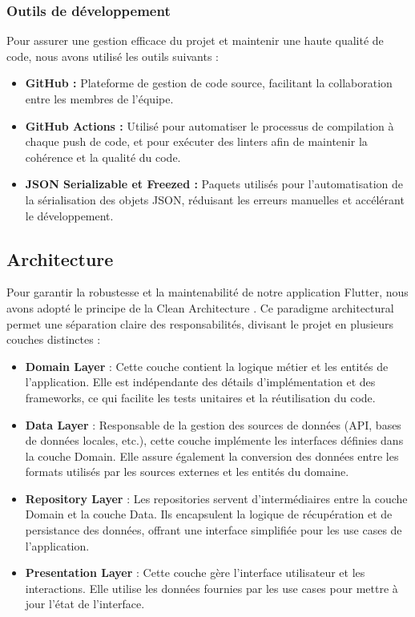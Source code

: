 \subsubsection{Outils de développement}

Pour assurer une gestion efficace du projet et maintenir une haute qualité de code, nous avons utilisé les outils suivants :

\begin{itemize}[noitemsep]
    \item \textbf{GitHub :} Plateforme de gestion de code source, facilitant la collaboration entre les membres de l'équipe.
    \item \textbf{GitHub Actions :} Utilisé pour automatiser le processus de compilation à chaque push de code, et pour exécuter des linters afin de maintenir la cohérence et la qualité du code.
    \item \textbf{JSON Serializable et Freezed :} Paquets utilisés pour l'automatisation de la sérialisation des objets JSON, réduisant les erreurs manuelles et accélérant le développement.
\end{itemize}

\subsection{Architecture}
\label{sec:architecture}

Pour garantir la robustesse et la maintenabilité de notre application Flutter, nous avons adopté le principe de la Clean Architecture \cite{cleanArchitecture}. Ce paradigme architectural permet une séparation claire des responsabilités, divisant le projet en plusieurs couches distinctes :

\begin{itemize}[noitemsep]
    \item \textbf{Domain Layer} : Cette couche contient la logique métier et les entités de l'application. Elle est indépendante des détails d'implémentation et des frameworks, ce qui facilite les tests unitaires et la réutilisation du code.
    \item \textbf{Data Layer} : Responsable de la gestion des sources de données (API, bases de données locales, etc.), cette couche implémente les interfaces définies dans la couche Domain. Elle assure également la conversion des données entre les formats utilisés par les sources externes et les entités du domaine.
    \item \textbf{Repository Layer} : Les repositories servent d'intermédiaires entre la couche Domain et la couche Data. Ils encapsulent la logique de récupération et de persistance des données, offrant une interface simplifiée pour les use cases de l'application.
    \item \textbf{Presentation Layer} : Cette couche gère l'interface utilisateur et les interactions. Elle utilise les données fournies par les use cases pour mettre à jour l'état de l'interface.
\end{itemize}


